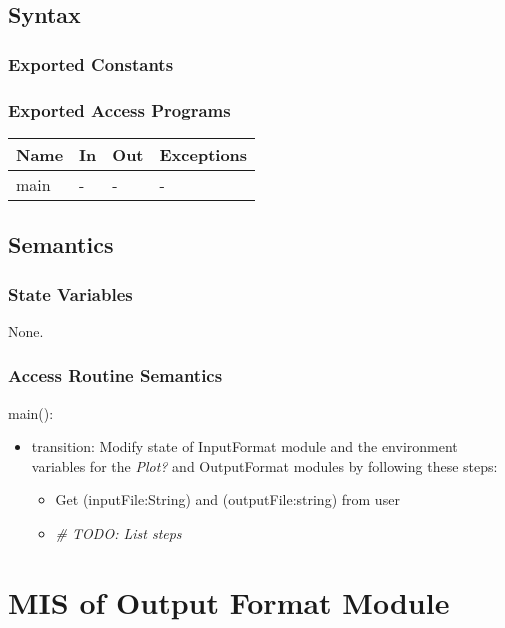 \documentclass[12pt, titlepage]{article}
\begin{document}
\subsection{Syntax}

\subsubsection{Exported Constants}

\subsubsection{Exported Access Programs}

\begin{center}
\begin{tabular}{p{2cm} p{4cm} p{4cm} p{2cm}}
\hline
\textbf{Name} & \textbf{In} & \textbf{Out} & \textbf{Exceptions} \\
\hline
main & - & - & - \\
\hline
\end{tabular}
\end{center}

\subsection{Semantics}

\subsubsection{State Variables}
None.

\subsubsection{Access Routine Semantics}

\noindent main():
\begin{itemize}
\item transition: Modify state of InputFormat module and the 
environment variables for the \emph{Plot?} and OutputFormat 
modules by following these steps:
  \begin{itemize}
    \item Get (inputFile:String) and (outputFile:string) from user
    \item \emph{\# TODO: List steps}
  \end{itemize}
\end{itemize}

\pagebreak
\section{MIS of Output Format Module} \label{OutputFormatModule} 
\end{document}

